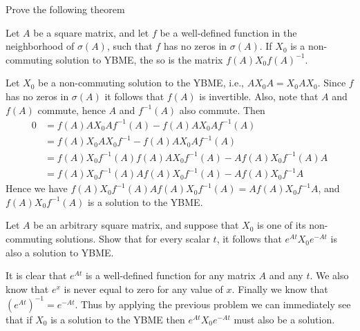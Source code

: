 \documentclass{article}
\begin{document}
\begin{problem}
  Prove the following theorem

  Let $A$ be a square matrix, and let $f$ be a well-defined function in the neighborhood of $\sigma(A)$,
  such that $f$ has no zeros in $\sigma(A)$.
  If $X_0$ is a non-commuting solution to YBME, the so is the matrix $f(A) X_0 f(A)^{-1}$.
\end{problem}

\begin{solution}
  Let $X_0$ be a non-commuting solution to the YBME, i.e., $A X_0 A = X_0 A X_0$.
  Since $f$ has no zeros in $\sigma(A)$ it follows that $f(A)$ is invertible.
  Also, note that $A$ and $f(A)$ commute, hence $A$ and $f^{-1}(A)$ also commute.
  Then
  \[\begin{aligned}
    0 &= f(A) A X_0 A f^{-1}(A) - f(A) A X_0 A f^{-1}(A)\\ 
    &= f(A) X_0 A X_0 f^{-1} - f(A) A X_0 A f^{-1}(A)\\
    &= f(A) X_0 f^{-1}(A) f(A) A X_0 f^{-1}(A) - A f(A) X_0 f^{-1}(A) A\\
    &= f(A) X_0 f^{-1}(A) A f(A) X_0 f^{-1}(A) - A f(A) X_0 f^{-1} A
  \end{aligned}\]
  Hence we have $f(A) X_0 f^{-1}(A) A f(A) X_0 f^{-1}(A) = A f(A) X_0 f^{-1} A$, and $f(A) X_0 f^{-1}(A)$ is a solution to the YBME.
\end{solution}

\begin{problem}
  Let $A$ be an arbitrary square matrix, and suppose that $X_0$ is one of its non-commuting solutions.
  Show that for every scalar $t$, it follows that $e^{At} X_0 e^{-At}$ is also a solution to YBME.
\end{problem}

\begin{solution}
  It is clear that $e^{At}$ is a well-defined function for any matrix $A$ and any $t$.
  We also know that $e^x$ is never equal to zero for any value of $x$.
  Finally we know that $(e^{At})^{-1} = e^{-At}$.
  Thus by applying the previous problem we can immediately see that if $X_0$ is a solution to the YBME then $e^{At} X_0 e^{-At}$ must also be a solution.
\end{solution}
\end{document}
